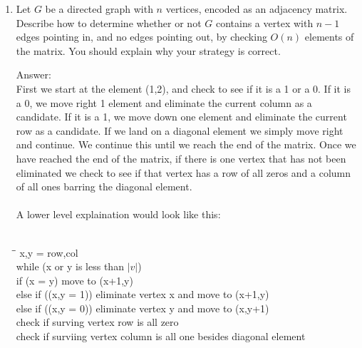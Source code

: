 \documentclass[12pt]{article}
\begin{document}
  
\pagestyle{empty}




\begin{enumerate}

\item 
Let $G$ be a directed graph with $n$ vertices, encoded as an adjacency matrix. Describe how to
determine whether or not $G$ contains a vertex with $n - 1$ edges pointing in, and no edges pointing
out, by checking $O(n)$ elements of the matrix. You should explain why your strategy is correct.\\

{\color{blue} Answer:  \\
First we start at the element (1,2), and check to see if it is a 1 or a 0. If it is a 0, we move right 1 element and eliminate the current column as a candidate. 
If it is a 1, we move down one element and eliminate the current row as a candidate. If we land on a diagonal element we simply move right and continue. 
We continue this until we reach the end of the matrix. Once we have reached the end of the matrix, if there is one vertex that has not been eliminated we check to 
see if that vertex has a row of all zeros and a column of all ones barring the diagonal element. \\\\

A lower level explaination would look like this:\\\\
\begin{tabbing}
\hspace{1cm}\=\hspace{8cm}\= \kill
x,y = row,col\\
while (x or y is less than $|v|$)\\
\> if (x = y) move to (x+1,y)\\
\> else if ((x,y = 1)) eliminate vertex x and move to (x+1,y)\\
\> else if ((x,y = 0)) eliminate vertex y and move to (x,y+1)\\
check if surving vertex row is all zero\\
check if surviing vertex column is all one besides diagonal element\\\\
\end{tabbing}

}
\end{enumerate}
\end{document}
